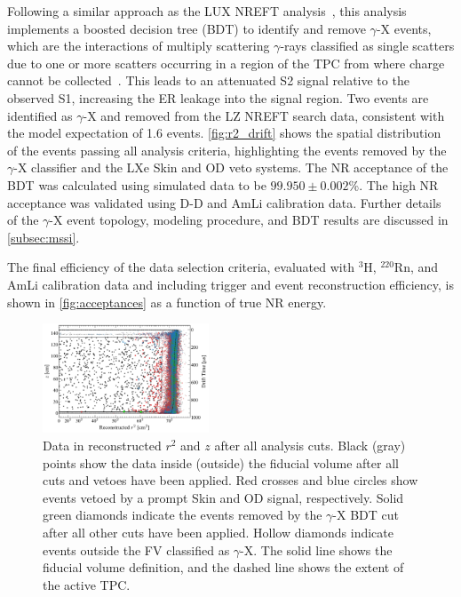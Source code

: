 \documentclass[reprint, showpacs,
preprintnumbers,
amsmath,amssymb,
aps, floatfix,
superscriptaddress,
prd, nofootinbib]{revtex4-1}
\begin{document}
Following a similar approach as the LUX NREFT analysis~\cite{LUX:EFTR4_2021}, this analysis implements a boosted decision tree (BDT) to identify and remove $\gamma$-X events, which are the interactions of multiply scattering $\gamma$-rays classified as single scatters due to one or more scatters occurring in a region of the TPC from where charge cannot be collected~\cite{LUX:EFTR4_2021}.
This leads to an attenuated S2 signal relative to the observed S1, increasing the ER leakage into the signal region.
Two events are identified as $\gamma$-X and removed from the LZ NREFT search data, consistent with the model expectation of 1.6 events. 
\autoref{fig:r2_drift} shows the spatial distribution of the events passing all analysis criteria, highlighting the events removed by the $\gamma$-X classifier and the LXe Skin and OD veto systems.
The NR acceptance of the BDT was calculated using simulated data to be $99.950 \pm 0.002$\%.
The high NR acceptance was validated using D-D and AmLi calibration data. 
Further details of the $\gamma$-X event topology, modeling procedure, and BDT results are discussed in \autoref{subsec:mssi}. 
\par
The final efficiency of the data selection criteria, evaluated with ${}^3$H, ${}^{220}$Rn, and AmLi calibration data and including trigger and event reconstruction efficiency, is shown in \autoref{fig:acceptances} as a function of true NR energy.

\begin{figure}[t]
    \centering
    \includegraphics[trim={8 5 5 5},clip, width=0.44\textwidth]{g_paper_rdrift_OD_SKIN}
    \caption{Data in reconstructed $r^2$ and $z$ after all analysis cuts. 
    Black (gray) points show the data inside (outside) the fiducial volume after all cuts and vetoes have been applied.
    Red crosses and blue circles show events vetoed by a prompt Skin and OD signal, respectively.
    Solid green diamonds indicate the events removed by the $\gamma$-X BDT cut after all other cuts have been applied. 
    Hollow diamonds indicate events outside the FV classified as $\gamma$-X.
    The solid line shows the fiducial volume definition, and the dashed line shows the extent of the active TPC.
    }
    \label{fig:r2_drift}
\end{figure}
\end{document}
